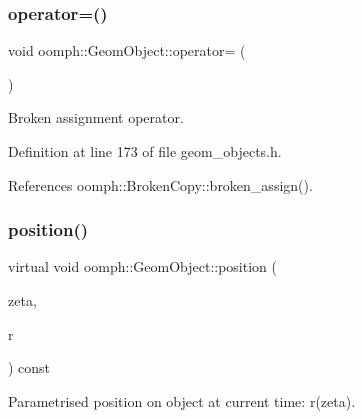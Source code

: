 \mbox{\label{classoomph_1_1GeomObject_a1b9d4809025ee6d0487710073b194fd3}} 
\subsubsection{\texorpdfstring{operator=()}{operator=()}}
{\footnotesize\ttfamily void oomph\+::\+Geom\+Object\+::operator= (\begin{DoxyParamCaption}\item[{const \hyperlink{classoomph_1_1GeomObject}{Geom\+Object} \&}]{ }\end{DoxyParamCaption})\hspace{0.3cm}{\ttfamily [inline]}}



Broken assignment operator. 



Definition at line 173 of file geom\+\_\+objects.\+h.



References oomph\+::\+Broken\+Copy\+::broken\+\_\+assign().

\mbox{\label{classoomph_1_1GeomObject_a0d04c9d4667817f3ef24bb660fd56065}} 
\subsubsection{\texorpdfstring{position()}{position()}\hspace{0.1cm}{\footnotesize\ttfamily [1/2]}}
{\footnotesize\ttfamily virtual void oomph\+::\+Geom\+Object\+::position (\begin{DoxyParamCaption}\item[{const \hyperlink{classoomph_1_1Vector}{Vector}$<$ double $>$ \&}]{zeta,  }\item[{\hyperlink{classoomph_1_1Vector}{Vector}$<$ double $>$ \&}]{r }\end{DoxyParamCaption}) const\hspace{0.3cm}{\ttfamily [pure virtual]}}



Parametrised position on object at current time\+: r(zeta). 



